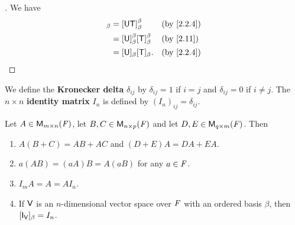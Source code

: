 \begin{proof}[]
  We have
  \begin{align*}
    [\U \T]_{\beta} & = [\U \T]_{\beta}^{\beta}                   &  & \text{(by \cref{2.2.4})} \\
                    & = [\U]_{\beta}^{\beta} [\T]_{\beta}^{\beta} &  & \text{(by \cref{2.11})}  \\
                    & = [\U]_{\beta} [\T]_{\beta}.                &  & \text{(by \cref{2.2.4})}
  \end{align*}
\end{proof}

\begin{defn}\label{2.3.4}
  We define the \textbf{Kronecker delta} \(\delta_{i j}\) by \(\delta_{i j} = 1\) if \(i = j\) and \(\delta_{i j} = 0\) if \(i \neq j\).
  The \(n \times n\) \textbf{identity matrix} \(I_n\) is defined by \((I_n)_{i j} = \delta_{i j}\).
\end{defn}

\begin{thm}\label{2.12}
  Let \(A \in \mathsf{M}_{{m} \times n}({\mathit{F}})\), let \(B, C \in \mathsf{M}_{{n} \times p}({\mathit{F}})\) and let \(D, E \in \mathsf{M}_{{q} \times m}({\mathit{F}})\).
  Then
  \begin{enumerate}
    \item \(A (B + C) = AB + AC\) and \((D + E) A = DA + EA\).
    \item \(a (AB) = (aA) B = A (aB)\) for any \(a \in \mathit{F}\).
    \item \(I_m A = A = A I_n\).
    \item If \(\mathsf{V}\) is an \(n\)-dimensional vector space over \(\mathit{F}\) with an ordered basis \(\beta\), then \([\IT[\V]]_{\beta} = I_n\).
  \end{enumerate}
\end{thm}

